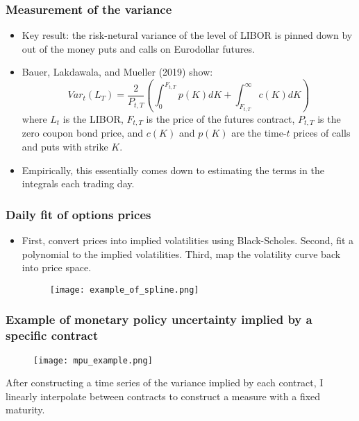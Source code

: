 \documentclass{beamer}
\begin{document}

\begin{frame}
\frametitle{Measurement of the variance}
\begin{itemize}
	\item Key result: the risk-netural variance of the level of LIBOR is pinned down by out of the money puts and calls on Eurodollar futures.  
	\item Bauer, Lakdawala, and Mueller (2019) show:
	\begin{equation}
		Var_{t}(L_{T}) = \dfrac{2}{P_{t, T}}\left(\int_{0}^{F_{t, T}}p(K)dK + \int_{F_{t, T}}^{\infty} c(K) dK\right)
	\end{equation}
	where $L_{t}$ is the LIBOR, $F_{t, T}$ is the price of the futures contract, $P_{t, T}$ is the zero coupon bond price, and $c(K)$ and $p(K)$ are the time-$t$ prices of calls and puts with strike $K$. 
	\item Empirically, this essentially comes down to estimating the terms in the integrals each trading day. 
\end{itemize}
\end{frame}

\begin{frame}
\frametitle{Daily fit of options prices}
\begin{itemize}
	\item First, convert prices into implied volatilities using Black-Scholes. Second, fit a polynomial to the implied volatilities. Third, map the volatility curve back into price space. 
	\begin{figure}
		\centering
		\texttt{[image: example\_of\_spline.png]}
	\end{figure}
\end{itemize}
\end{frame}


\begin{frame}
\frametitle{Example of monetary policy uncertainty implied by a specific contract}
		\begin{figure}
		\centering
		\texttt{[image: mpu\_example.png]}
	\end{figure}
After constructing a time series of the variance implied by each contract, I linearly interpolate between contracts to construct a measure with a fixed maturity. 
\end{frame}
\end{document}
